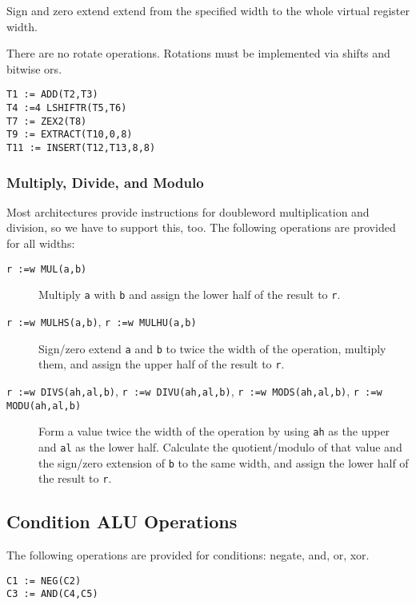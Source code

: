 \documentclass{article}
\newcommand{\ir}[1]{\texttt{#1}}
\begin{document}
Sign and zero extend extend from the specified width to the whole
virtual register width.  

There are no rotate operations.  Rotations must be implemented via
shifts and bitwise ors.

\begin{verbatim}
T1 := ADD(T2,T3)
T4 :=4 LSHIFTR(T5,T6)
T7 := ZEX2(T8)
T9 := EXTRACT(T10,0,8)
T11 := INSERT(T12,T13,8,8)
\end{verbatim}

\subsubsection{Multiply, Divide, and Modulo}

Most architectures provide instructions for doubleword multiplication
and division, so we have to support this, too.  The following
operations are provided for all widths:

\begin{description}
\item[\ir{r :=w MUL(a,b)}] Multiply \ir{a} with \ir{b} and
assign the lower half of the result to \ir{r}.

\item[\ir{r :=w MULHS(a,b)}, \ir{r :=w MULHU(a,b)}] Sign/zero extend
\ir{a} and \ir{b} to twice the width of the operation, multiply them,
and assign the upper half of the result to \ir{r}.

\item[\ir{r :=w DIVS(ah,al,b)}, \ir{r :=w DIVU(ah,al,b)},
\ir{r :=w MODS(ah,al,b)}, \ir{r :=w MODU(ah,al,b)}] Form a value twice
the width of the operation by using \ir{ah} as the upper and \ir{al} as
the lower half.  Calculate the quotient/modulo of that value and the
sign/zero extension of \ir{b} to the same width, and assign the lower
half of the result to \ir{r}.
\end{description}

\subsection{Condition ALU Operations}

The following operations are provided for conditions: negate, and, or,
xor.

\begin{verbatim}
C1 := NEG(C2)
C3 := AND(C4,C5)
\end{verbatim}
\end{document}
